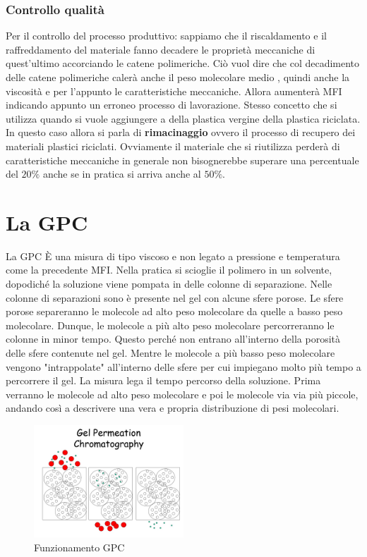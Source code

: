 \subsubsection{Controllo qualità}
Per il controllo del processo produttivo: sappiamo che il riscaldamento e il raffreddamento del materiale fanno decadere le proprietà meccaniche di quest'ultimo accorciando le catene polimeriche. 
Ciò vuol dire che col decadimento delle catene polimeriche calerà anche il peso molecolare medio , quindi anche la viscosità e per l'appunto le caratteristiche meccaniche. Allora aumenterà \ac{MFI} indicando appunto un erroneo processo di lavorazione.
Stesso concetto che si utilizza quando si vuole aggiungere a della plastica vergine della plastica riciclata. In questo caso allora si parla di \textbf{rimacinaggio} ovvero il processo di recupero dei materiali plastici riciclati.
Ovviamente il materiale che si riutilizza perderà di caratteristiche meccaniche in generale non bisognerebbe superare una percentuale del $20\%$ anche se in pratica si arriva anche al $50\%$.

\section{La GPC}
La \ac{GPC} È una misura di tipo viscoso e non legato a pressione e temperatura come la precedente \ac{MFI}.
Nella pratica si scioglie il polimero in un solvente, dopodiché la soluzione viene pompata in delle colonne di separazione. Nelle colonne di separazioni sono è presente nel gel con alcune sfere porose. Le sfere porose separeranno le molecole ad alto peso molecolare da quelle a basso peso molecolare.
Dunque, le molecole a più alto peso molecolare percorreranno le colonne in minor tempo. Questo perché non entrano all'interno della porosità delle sfere contenute nel gel. Mentre le molecole a più basso peso molecolare vengono "intrappolate" all'interno delle sfere per cui impiegano molto più tempo a percorrere il gel.
La misura lega il tempo percorso della soluzione. Prima verranno le molecole ad alto peso molecolare e poi le molecole via via più piccole, andando così a descrivere una vera e propria distribuzione di pesi molecolari.

\begin{figure}
\centering
\includegraphics[width = 0.5\textwidth]{gfx/GPC}
\caption{Funzionamento \ac{GPC} \cite{GPC:2023}}
\label{fig:GPC1}
\end{figure} 


